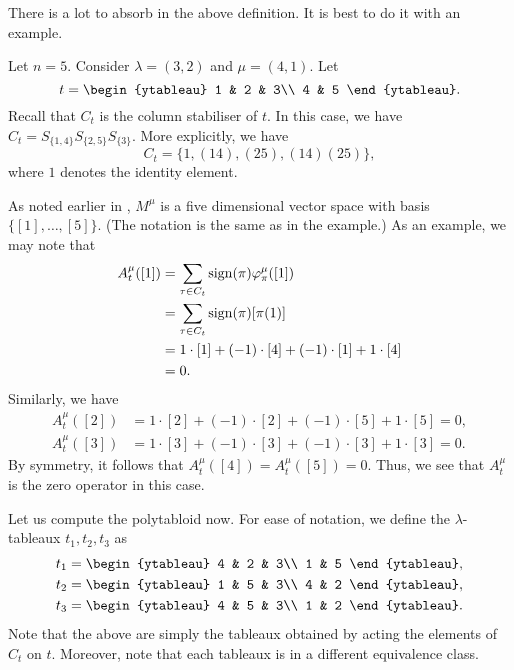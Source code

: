 There is a lot to absorb in the above definition. It is best to do it with an example.
\begin{ex}
	Let $n = 5.$ Consider $\lambda = (3, 2)$ and $\mu = (4, 1).$ Let 
	\begin{equation*} 
		t = \begin{ytableau}
			1 & 2 & 3\\
			4 & 5
		\end{ytableau}.
	\end{equation*}
	Recall that $C_t$ is the column stabiliser of $t.$ In this case, we have $C_t = S_{\{1, 4\}}S_{\{2, 5\}}S_{\{3\}}.$ More explicitly, we have
	\begin{equation*} 
		C_t = \{1, (14), (25), (14)(25)\},
	\end{equation*}
	where $1$ denotes the identity element. 

	As noted earlier in , $M^\mu$ is a five dimensional vector space with basis $\{[1], \ldots, [5]\}.$ (The notation is the same as in the example.) As an example, we may note that
	\begin{align*} 
		A^\mu_t([1]) &= \sum_{\tau \in C_t}\operatorname{sign}(\pi)\varphi^\mu_\pi([1])\\
		&= \sum_{\tau \in C_t}\operatorname{sign}(\pi)[\pi(1)]\\
		&= 1\cdot[1] + (-1)\cdot[4] + (-1)\cdot[1] + 1\cdot[4]\\
		&= 0.
	\end{align*}
	Similarly, we have
	\begin{align*} 
		A^\mu_t([2]) &= 1\cdot[2] + (-1)\cdot[2] + (-1)\cdot[5] + 1\cdot[5] = 0,\\
		A^\mu_t([3]) &= 1\cdot[3] + (-1)\cdot[3] + (-1)\cdot[3] + 1\cdot[3] = 0.
	\end{align*}
	By symmetry, it follows that $A^\mu_t([4]) = A^\mu_t([5]) = 0.$ Thus, we see that $A^\mu_t$ is the zero operator in this case.

	Let us compute the polytabloid now. For ease of notation, we define the $\lambda$-tableaux $t_1, t_2, t_3$ as
	\begin{align*} 
	 	t_1 &= \begin{ytableau}
			4 & 2 & 3\\
			1 & 5
		\end{ytableau},\\
		t_2 &= \begin{ytableau}
			1 & 5 & 3\\
			4 & 2
		\end{ytableau},\\
		t_3 &= \begin{ytableau}
			4 & 5 & 3\\
			1 & 2
		\end{ytableau}.
	\end{align*} 
	Note that the above are simply the tableaux obtained by acting the elements of $C_t$ on $t.$ Moreover, note that each tableaux is in a different equivalence class.


\end{ex}
